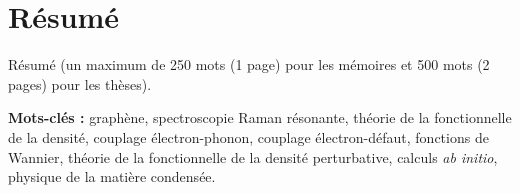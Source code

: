 
\francais
\chapter*{Résumé}

Résumé (un maximum de 250 mots (1 page) pour les mémoires et 500 mots (2 pages) pour les thèses).

{\bf Mots-cl\'es :} graphène, spectroscopie Raman résonante, théorie de la fonctionnelle de la densité, couplage électron-phonon, couplage électron-défaut, fonctions de Wannier, théorie de la fonctionnelle de la densité perturbative, calculs \textit{ab initio}, physique de la matière condensée.